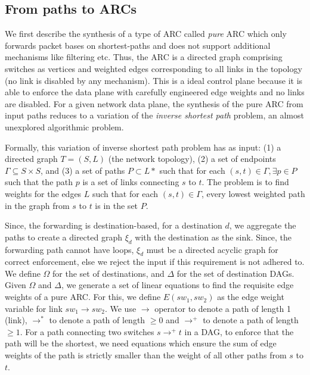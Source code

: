 

\subsection{From paths to ARCs}

We first describe the synthesis of a type of ARC 
called {\em pure} ARC which
only forwards packet bases on shortest-paths and does 
not support additional mechanisms like filtering etc. 
Thus, 
the ARC is a directed graph comprising switches as 
vertices and weighted edges corresponding to all links in the
topology (no link is disabled by any mechanism). 
This is 
a ideal control plane because it is able to enforce the data plane
with carefully engineered edge weights and no links are disabled. 
For a given network data plane, the synthesis of 
the pure ARC from input paths reduces to a
variation of the {\em inverse shortest path} problem, an almost 
unexplored algorithmic problem. 

Formally, this variation of inverse shortest path problem 
has as input: (1) a directed graph $T = (S, L)$ (the network topology), 
(2) a set of endpoints $\Gamma \subseteq S\times S$, and 
(3) a set of paths $P \subset L*$
such that for each $(s,t) \in \Gamma, \exists p \in P$ such
that the path $p$ is a set of links connecting $s$ to $t$. 
The problem is to find weights for the edges $L$ such that 
for each $(s,t) \in \Gamma$, every lowest weighted path 
in the graph 
from $s$ to $t$ is in the set $P$. 

Since, the forwarding is destination-based,
for a destination $d$, we aggregate the paths 
to create a directed graph $\xi_d$ with the destination
as the sink. Since, the forwarding path cannot have 
loops, $\xi_d$ must be a directed acyclic graph for 
correct enforcement, else we reject the input if this
requirement is not adhered to.
We define $\Omega$ for the 
set of destinations, and $\Delta$ for  
the set of destination DAGs. 
Given $\Omega$ and $\Delta$, we generate a set of linear equations
to find the requisite edge weights of a pure ARC. 
For this, we define $E(sw_1, sw_2)$ as
the edge weight variable for link $sw_1 \rightarrow sw_2$. 
We use $\rightarrow$ operator to denote a path of length 1 
(link), $\rightarrow^*$ to denote a path of length $\geq 0$
and $\rightarrow^+$ to denote a path of length $\geq 1$.
For a path connecting two switches 
$s \rightarrow^+ t$ in a DAG, 
to enforce that the path will be the shortest, we need equations
which ensure the sum of edge weights of the path is strictly smaller than
the weight of all other paths from $s$ to $t$. 

